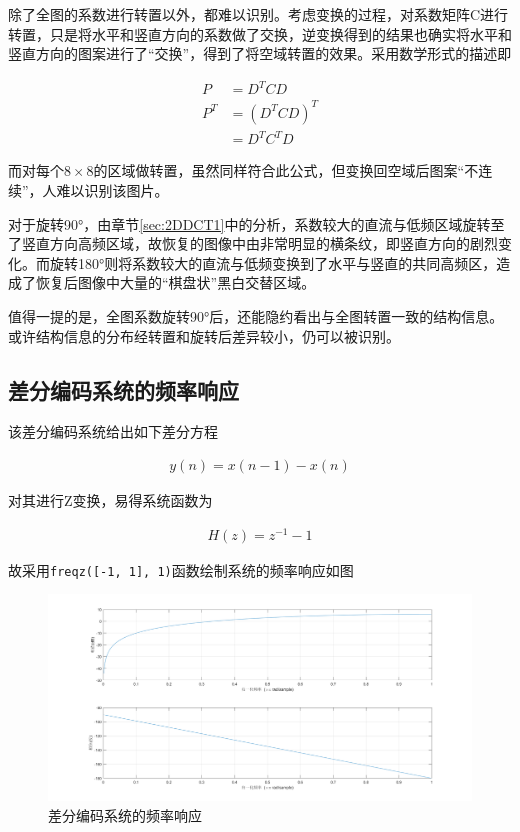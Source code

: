 \documentclass[10pt, a4paper]{article}
\begin{document}
除了全图的系数进行转置以外，都难以识别。考虑变换的过程，对系数矩阵C进行转置，只是将水平和竖直方向的系数做了交换，逆变换得到的结果也确实将水平和竖直方向的图案进行了“交换”，得到了将空域转置的效果。采用数学形式的描述即

\begin{align*}
    P   & = D^TCD     \\
    P^T & = (D^TCD)^T \\
        & =D^TC^TD
\end{align*}

而对每个$8\times8$的区域做转置，虽然同样符合此公式，但变换回空域后图案“不连续”，人难以识别该图片。

对于旋转\ang{90}，由章节\ref*{sec:2DDCT1}中的分析，系数较大的直流与低频区域旋转至了竖直方向高频区域，故恢复的图像中由非常明显的横条纹，即竖直方向的剧烈变化。而旋转\ang{180}则将系数较大的直流与低频变换到了水平与竖直的共同高频区，造成了恢复后图像中大量的“棋盘状”黑白交替区域。

值得一提的是，全图系数旋转\ang{90}后，还能隐约看出与全图转置一致的结构信息。或许结构信息的分布经转置和旋转后差异较小，仍可以被识别。

\subsection{差分编码系统的频率响应}

该差分编码系统给出如下差分方程

\begin{align*}
    y(n) = x(n - 1) - x(n)
\end{align*}

对其进行Z变换，易得系统函数为

\begin{align*}
    H(z) = z^{-1} - 1
\end{align*}

故采用\texttt{freqz([-1, 1], 1)}函数绘制系统的频率响应如图

\begin{figure}[h]
    \centering
    \includegraphics[width=.9\textwidth]{"../assets/2_5.png"}
    \caption{差分编码系统的频率响应}
    \label{fig:exp2_5}
\end{figure}
\end{document}
